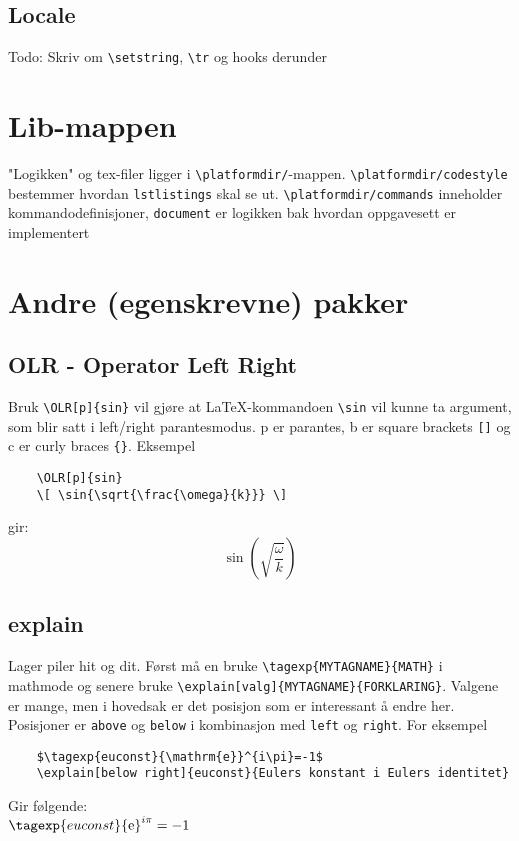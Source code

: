 \documentclass{article}
\def\platformdir{.}
\begin{document}
\subsection*{Locale}
Todo: Skriv om \lstinline{\setstring}, \lstinline{\tr} og hooks derunder
\section*{Lib-mappen}
"Logikken" og tex-filer ligger i \lstinline|\platformdir/|-mappen.
\lstinline|\platformdir/codestyle| bestemmer hvordan \lstinline|lstlistings| skal se ut. \lstinline|\platformdir/commands| inneholder kommandodefinisjoner, \lstinline|document| er logikken bak hvordan oppgavesett er implementert
\clearpage
\section*{Andre (egenskrevne) pakker}
\subsection*{OLR - Operator Left Right}
Bruk \lstinline|\OLR[p]{sin}| vil gjøre at LaTeX-kommandoen \lstinline{\sin} vil kunne ta argument, som blir satt i left/right parantesmodus. p er parantes, b er square brackets \lstinline|[]| og c er curly braces \lstinline|{}|.
Eksempel

\begin{lstlisting}
	\OLR[p]{sin}
	\[ \sin{\sqrt{\frac{\omega}{k}}} \]
\end{lstlisting}
gir:\\
\[ \sin\left(\sqrt{\frac{\omega}{k}}\right) \]

\subsection*{explain}
Lager piler hit og dit. Først må en bruke \lstinline|\tagexp{MYTAGNAME}{MATH}| i mathmode og senere bruke \lstinline|\explain[valg]{MYTAGNAME}{FORKLARING}|. Valgene er mange, men i hovedsak er det posisjon som er interessant å endre her. Posisjoner er \lstinline{above} og \lstinline{below} i kombinasjon med \lstinline{left} og \lstinline{right}. For eksempel
\begin{lstlisting}
	$\tagexp{euconst}{\mathrm{e}}^{i\pi}=-1$
	\explain[below right]{euconst}{Eulers konstant i Eulers identitet}
\end{lstlisting}
Gir følgende:\\
$\tagexp{euconst}{\mathrm{e}}^{i\pi}=-1$
\vspace*{3em}
\end{document}
